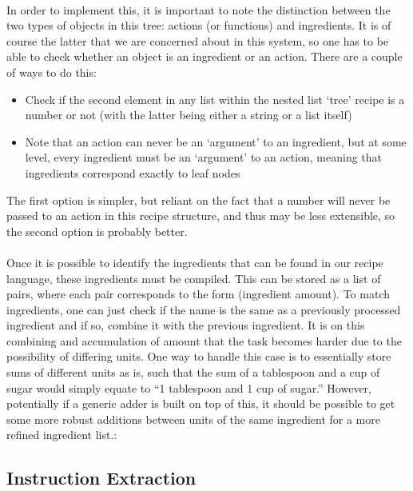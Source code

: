\paragraph{}
In order to implement this, it is important to note the distinction between the two types of objects in this tree: actions (or functions) and ingredients. It is of course the latter that we are concerned about in this system, so one has to be able to check whether an object is an ingredient or an action. There are a couple of ways to do this:
\begin{itemize}
\item Check if the second element in any list within the nested list `tree' recipe is a number or not (with the latter being either a string or a list itself)
\item Note that an action can never be an `argument' to an ingredient, but at some level, every ingredient must be an `argument' to an action, meaning that ingredients correspond exactly to leaf nodes
\end{itemize}

The first option is simpler, but reliant on the fact that a number will never be passed to an action in this recipe structure, and thus may be less extensible, so the second option is probably better.

\paragraph{}
Once it is possible to identify the ingredients that can be found in our recipe language, these ingredients must be compiled. This can be stored as a list of pairs, where each pair corresponds to the form (ingredient amount). To match ingredients, one can just check if the name is the same as a previously processed ingredient and if so, combine it with the previous ingredient. It is on this combining and accumulation of amount that the task becomes harder due to the possibility of differing units. One way to handle this case is to essentially store sums of different units as is, such that the sum of a tablespoon and a cup of sugar would simply equate to ``1 tablespoon and 1 cup of sugar.'' However, potentially if a generic adder is built on top of this, it should be possible to get some more robust additions between units of the same ingredient for a more refined ingredient list.:


\subsection{Instruction Extraction}
